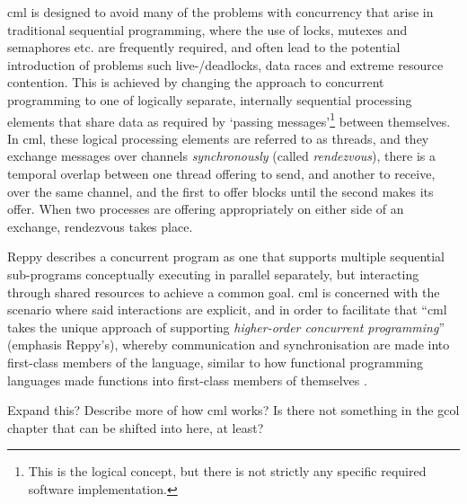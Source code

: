 \Gls{cml} is designed to avoid many of the problems with concurrency that arise in traditional sequential programming, where the use of locks, mutexes and semaphores etc. are frequently required, and often lead to the potential introduction of problems such live-/deadlocks, data races and extreme resource contention.  This is achieved by changing the approach to concurrent programming to one of logically separate, internally sequential processing elements that share data as required by `passing messages'\footnote{This is the logical concept, but there is not strictly any specific required software implementation.} between themselves.  In \gls{cml}, these logical processing elements are referred to as threads, and they exchange messages over channels \emph{synchronously} (called \emph{rendezvous}), \ie{} there is a temporal overlap between one thread offering to send, and another to receive, over the same channel, and the first to offer blocks until the second makes its offer.  When two processes are offering appropriately on either side of an exchange, rendezvous takes place.

Reppy describes a concurrent program as one that supports multiple sequential sub-programs conceptually executing in parallel separately, but interacting through shared resources to achieve a common goal.  \Gls{cml} is concerned with the scenario where said interactions are explicit, and in order to facilitate that \enquote{\gls{cml} takes the unique approach of supporting \emph{higher-order concurrent programming}} (emphasis Reppy's), whereby communication and synchronisation are made into first-class members of the language, similar to how functional programming languages made functions into first-class members of themselves \cite[Preface]{Reppy2007}.

\begin{anfxerror}{Expand this?}
Describe more of how \gls{cml} works?  Is there not something in the gcol chapter that can be shifted into here, at least?
\end{anfxerror}